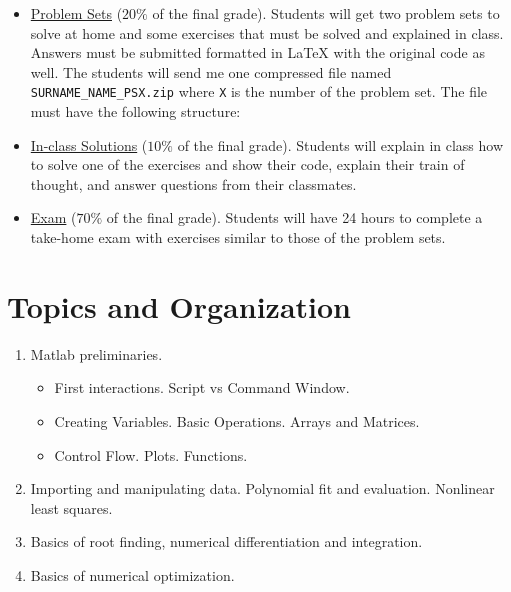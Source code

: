\documentclass[a4paper,12pt]{article}
\begin{document}
\begin{itemize}
    \item \underline{Problem Sets} ($20\%$ of the final grade).
    Students will get two problem sets to solve at home and some exercises that must be solved and explained in class. Answers must be submitted formatted in { \LaTeX } with the original code as well. The students will send me one compressed file named \verb+SURNAME_NAME_PSX.zip+ where \verb+X+ is the number of the problem set. The file must have the following structure:
    
    \begin{minipage}[c]{0.8\textwidth}
    \end{minipage}
    \item \underline{In-class Solutions} ($10\%$ of the final grade). Students will explain in class how to solve one of the exercises and show their code, explain their train of thought, and answer questions from their classmates.
    \item \underline{Exam} ($70\%$ of the final grade). Students will have 24 hours to complete a take-home exam with exercises similar to those of the problem sets.
\end{itemize}

\section{Topics and Organization}

\begin{enumerate}[label={\textbf{Session \arabic*}}]
    \item Matlab preliminaries. 
    \begin{itemize}
        \item First interactions. Script vs Command Window.
        \item Creating Variables. Basic Operations. Arrays and Matrices.
        \item Control Flow. Plots. Functions.
    \end{itemize}
    \item Importing and manipulating data. Polynomial fit and evaluation. Nonlinear least squares.
    \item Basics of root finding, numerical differentiation and integration.
    \item Basics of numerical optimization.
\end{enumerate}
\end{document}
